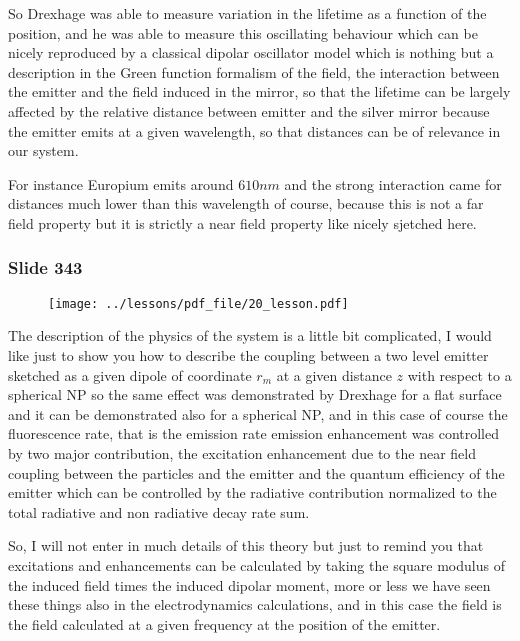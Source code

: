 \documentclass[../main/main.tex]{subfiles}
\begin{document}
So Drexhage was able to measure variation in the lifetime as a function of the position, and he was able to measure this oscillating behaviour which can be nicely reproduced by a classical dipolar oscillator model which is nothing but a description in the Green function formalism of the field, the interaction between the emitter and the field induced in the mirror, so that the lifetime can be largely affected by the relative distance between emitter and the silver mirror because the emitter emits at a given wavelength, so that distances can be of relevance in our system. 

For instance Europium emits around $610 nm$ and the strong interaction came for distances much lower than this wavelength of course, because this is not a far field property but it is strictly a near field property like nicely sjetched here.

\newpage

\subsubsection{Slide 343}

\begin{figure}[h!]
\centering
\texttt{[image: ../lessons/pdf\_file/20\_lesson.pdf]}
\end{figure}

The description of the physics of the system is a little bit complicated, I would like just to show you how to describe the coupling between a two level emitter sketched as a given dipole of coordinate $r_m$ at a given distance $z$ with respect to a spherical NP so the same effect was demonstrated by Drexhage for a flat surface and it can be demonstrated also for a spherical NP, and in this case of course the fluorescence rate, that is the emission rate emission enhancement was controlled by two major contribution, the excitation enhancement due to the near field coupling between the particles and the emitter and the quantum efficiency of the emitter which can be controlled by the radiative contribution normalized to the total radiative and non radiative decay rate sum.

So, I will not enter in much details of this theory but just to remind you that excitations and enhancements can be calculated by taking the square modulus of the induced field times the induced dipolar moment, more or less we have seen these things also in the electrodynamics calculations, and in this case the field is the field calculated at a given frequency at the position of the emitter. 
\end{document}
